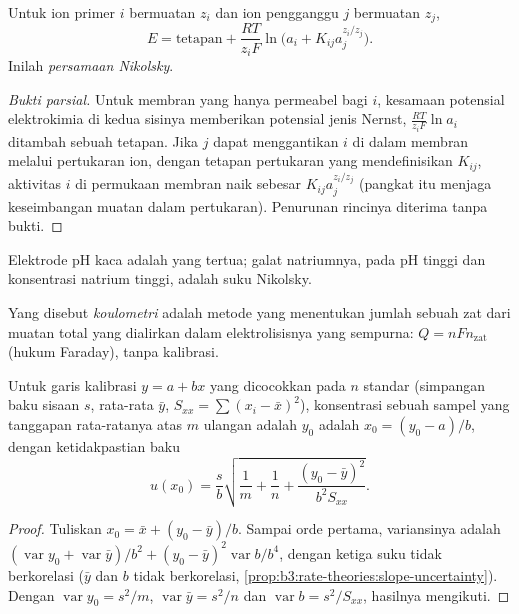 \begin{proposition}\label{prop:b3:electrode-kinetics:nikolsky}
Untuk ion primer $i$ bermuatan $z_i$ dan ion pengganggu $j$ bermuatan $z_j$,
\[
  E = \text{tetapan} + \frac{RT}{z_iF}\ln\bigl(a_i + K_{ij}a_j^{z_i/z_j}\bigr) .
\]
Inilah \emph{persamaan Nikolsky}.
\end{proposition}

\begin{proof}[Bukti parsial]
Untuk membran yang hanya permeabel bagi $i$, kesamaan potensial elektrokimia
di kedua sisinya memberikan potensial jenis Nernst, $\frac{RT}{z_iF}\ln a_i$
ditambah sebuah tetapan. Jika $j$ dapat menggantikan $i$ di dalam membran
melalui pertukaran ion, dengan tetapan pertukaran yang mendefinisikan $K_{ij}$,
aktivitas $i$ di permukaan membran naik sebesar $K_{ij}a_j^{z_i/z_j}$ (pangkat itu
menjaga keseimbangan muatan dalam pertukaran). Penurunan rincinya diterima
tanpa bukti.
\end{proof}

Elektrode pH kaca adalah  yang tertua; galat natriumnya,
pada pH tinggi dan konsentrasi natrium tinggi, adalah suku Nikolsky.

\begin{definition}[Koulometri]\label{def:b3:electrode-kinetics:coulometry}
Yang disebut \emph{koulometri} adalah metode yang menentukan
jumlah sebuah zat dari muatan total yang dialirkan dalam elektrolisisnya yang
sempurna: $Q = nFn_{\text{zat}}$ (hukum Faraday), tanpa kalibrasi.
\end{definition}

\begin{proposition}\label{prop:b3:electrode-kinetics:inverse-prediction}
Untuk garis kalibrasi $y = a + bx$ yang dicocokkan pada $n$ standar
(simpangan baku sisaan $s$, rata-rata $\bar y$, $S_{xx} = \sum(x_i - \bar x)^2$),
konsentrasi sebuah sampel yang tanggapan rata-ratanya atas $m$ ulangan adalah
$y_0$ adalah $x_0 = (y_0 - a)/b$, dengan ketidakpastian baku
\[
  u(x_0) = \frac{s}{b}\sqrt{\frac1m + \frac1n + \frac{(y_0 - \bar y)^2}{b^2S_{xx}}} .
\]
\end{proposition}

\begin{proof}
Tuliskan $x_0 = \bar x + (y_0 - \bar y)/b$. Sampai orde pertama, variansinya adalah
$(\operatorname{var}y_0 +
\operatorname{var}\bar y)/b^2 + (y_0 - \bar y)^2\operatorname{var}b/b^4$, dengan ketiga suku
tidak berkorelasi ($\bar y$ dan $b$
tidak berkorelasi, \cref{prop:b3:rate-theories:slope-uncertainty}). Dengan
$\operatorname{var}y_0 =
s^2/m$, $\operatorname{var}\bar y = s^2/n$ dan $\operatorname{var}b = s^2/S_{xx}$, hasilnya
mengikuti.
\end{proof}


